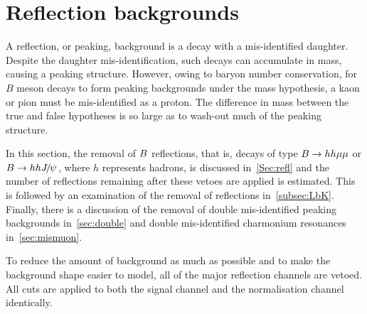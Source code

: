 \section{Reflection backgrounds}
\label{Sec:backgrounds}
A reflection, or peaking, background is a decay with a mis-identified daughter. Despite the daughter mis-identification, such decays can accumulate in mass, causing a peaking structure. However, owing to baryon number conservation, for $B$ meson decays to form peaking backgrounds under the \Lbpi mass hypothesis, a kaon or pion must be mis-identified as a proton. The difference in mass between the true and false hypotheses is so large as to wash-out much of the peaking structure.



In this section, the removal of ${B}$ reflections, that is, decays of type ${B}\rightarrow hh\mu\mu$ or ${B}\rightarrow hh{{J\mkern -3mu/\mkern -2mu\psi\mkern 2mu}}$, where $h$ represents hadrons, is discussed in~\autoref{Sec:refl} and the number of reflections remaining after these vetoes are applied is estimated. This is followed by an examination of the removal of \LbK reflections in~\autoref{subsec:LbK}. Finally, there is a discussion of the removal of double mis-identified peaking backgrounds in~\autoref{sec:double} and double mis-identified charmonium resonances in~\autoref{sec:mismuon}.

To reduce the amount of background as much as possible and to make the background shape easier to model, all of the major reflection channels are vetoed. All cuts are applied to both the signal channel \Lbpi and the normalisation channel \Lbpijpsi identically.


